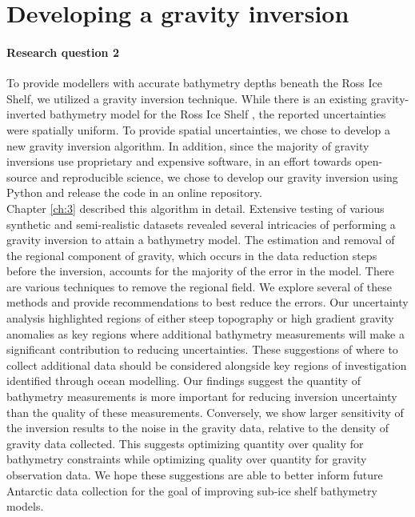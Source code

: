 \section[Inversion]{Developing a gravity inversion}
\paragraph*{Research question 2}

To provide modellers with accurate bathymetry depths beneath the Ross Ice Shelf, we utilized a gravity inversion technique. While there is an existing gravity-inverted bathymetry model for the Ross  Ice Shelf \citep{tintoross2019}, the reported uncertainties were spatially uniform. To provide spatial uncertainties, we chose to develop a new gravity inversion algorithm. In addition, since the majority of gravity inversions use proprietary and expensive software, in an effort towards open-source and reproducible science, we chose to develop our gravity inversion using Python and release the code in an online repository. \\

Chapter \ref{ch:3} described this algorithm in detail. Extensive testing of various synthetic and semi-realistic datasets revealed several intricacies of performing a gravity inversion to attain a bathymetry model. The estimation and removal of the regional component of gravity, which occurs in the data reduction steps before the inversion, accounts for the majority of the error in the model. There are various techniques to remove the regional field. We explore several of these methods and provide recommendations to best reduce the errors. 
Our uncertainty analysis highlighted regions of either steep topography or high gradient gravity anomalies as key regions where additional bathymetry measurements will make a significant contribution to reducing uncertainties. These suggestions of where to collect additional data should be considered alongside key regions of investigation identified through ocean modelling. Our findings suggest the quantity of bathymetry measurements is more important for reducing inversion uncertainty than the quality of these measurements. Conversely, we show larger sensitivity of the inversion results to the noise in the gravity data, relative to the density of gravity data collected. This suggests optimizing quantity over quality for bathymetry constraints while optimizing quality over quantity for gravity observation data. We hope these suggestions are able to better inform future Antarctic data collection for the goal of improving sub-ice shelf bathymetry models. \\

